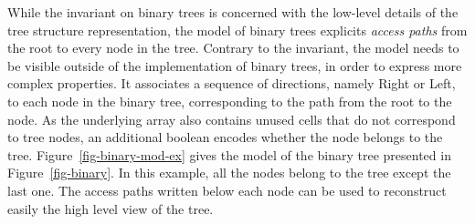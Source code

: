 \documentclass{llncs}
\begin{document}




While the invariant on binary trees is concerned with the low-level details of
the tree structure representation, the model of binary trees explicits
\emph{access paths} from the root to every node in the tree. Contrary to the invariant,
the model needs to be visible outside of the implementation of binary trees, in
order to express more complex properties. It associates a sequence of
directions, namely Right or Left, to each node in the binary tree,
corresponding to the path from the root to the node. As the underlying array
also contains unused cells that do not correspond to tree nodes, an additional
boolean encodes whether the node belongs to the
tree. Figure~\ref{fig-binary-mod-ex} gives the model of the binary tree
presented in Figure~\ref{fig-binary}. In this example, all the nodes belong to
the tree except the last one. The access paths written below each node can be used to
reconstruct easily the high level view of the tree.
\end{document}

